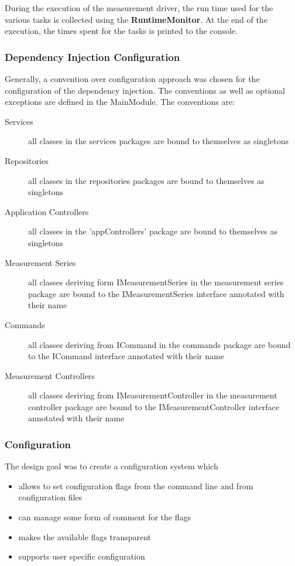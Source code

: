 \documentclass[a4paper,12pt]{article}
\newcommand{\class}[1]{\textbf{#1}}
\begin{document}
During the execution of the measurement driver, the run time used for the
various tasks is collected using the \class{RuntimeMonitor}. At the end of the
execution, the times spent for the tasks is printed to the console.


\subsubsection{Dependency Injection Configuration}
Generally, a convention over configuration approach was chosen for the
configuration of the dependency injection. The conventions as well as optional
exceptions are defined in the MainModule. 
The conventions are:
\begin{description}
\item[Services] all classes in the services packages are bound to themselves as
singletons
\item[Repositories] all classes in the repositories packages are bound to
themselves as singletons
\item[Application Controllers] all classes in the 'appControllers' package are
bound to themselves as singletons
\item[Measurement Series] all classes deriving form IMeasurementSeries in the
measurement series package are bound to the IMeasurementSeries interface
annotated with their name
\item[Commands] all classes deriving from ICommand in the commands package are
bound to the ICommand interface annotated with their name
\item[Measurement Controllers] all classes deriving from IMeasurementController
in the measurement controller package are bound to the IMeasurementController
interface annotated with their name
\end{description}

\subsubsection{Configuration}
The design goal was to create a configuration system which
\begin{itemize}
\item allows to set configuration flags from the command line and from
configuration files
\item can manage some form of comment for the flags
\item makes the available flags transparent
\item supports user specific configuration
\end{itemize}
\end{document}

